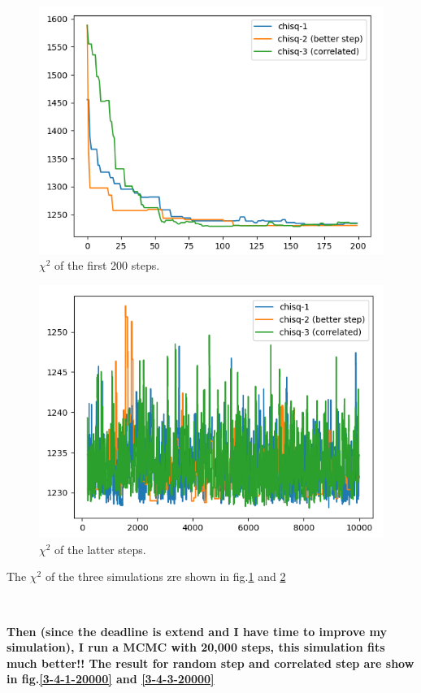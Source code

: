 \documentclass[showpacs, oneside, onecolumn, prl, amsmath, amssymb, nofootinbib, superscriptaddress, notitlepage]{revtex4-1}
\newcommand\bfig{\begin{figure}}
\newcommand\efig{\end{figure}}
\begin{document}
\bfig
	\centering
	\includegraphics[scale=0.85]{3-4-chi(200).png}
	\caption{$\chi^2$ of the first 200 steps.}
	\label{3-4-4}
\efig

\bfig
	\centering
	\includegraphics[scale=0.85]{3-4-chi(9800).png}
	\caption{$\chi^2$ of the latter steps.}
	\label{3-4-5}
\efig

The $\chi^2$ of the three simulations zre shown in fig.\ref{3-4-4} and \ref{3-4-5}

~~~~

\textbf{Then (since the deadline is extend and I have time to improve my simulation), I run a MCMC with 20,000 steps, this simulation fits much better!! The result for random step and correlated step are show in fig.\ref{3-4-1-20000} and \ref{3-4-3-20000}}
\end{document}
